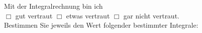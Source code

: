 \documentclass[12pt]{exam}
\begin{document}
\begin{questions}
\begin{parts}
\end{parts}
\pagebreak
{}

Mit der Integralrechnung bin ich\\ $\Box$ gut vertraut \hfill $\Box$ etwas vertraut \hfill $\Box$ gar nicht vertraut. \\[2ex]
Bestimmen Sie jeweils den Wert folgender bestimmter Integrale:\\

\begin{parts}

\part \[\int_a^b x {\rm ~d}x = 
~~~~~~~~~~~~~~~~~~~~~~~~~~~~~~~~~~~~~~~~~~~~~~~~~~~~~~~~~~~~~~~~~~~~~~~~~~~~\]
~~\\~~\\~~\\

\part \[\int_0^x {\rm e}^{at} {\rm ~d}t = 
~~~~~~~~~~~~~~~~~~~~~~~~~~~~~~~~~~~~~~~~~~~~~~~~~~~~~~~~~~~~~~~~~~~~~~~~~~~~\]
~~\\~~\\~~\\

\part \[\int_0^\pi \sin u {\rm ~d}u = 
~~~~~~~~~~~~~~~~~~~~~~~~~~~~~~~~~~~~~~~~~~~~~~~~~~~~~~~~~~~~~~~~~~~~~~~~~~~~\]
~~\\~~\\~~\\

\part \[\int_1^{\Lambda} \frac{w-1}{w^2-1} {\rm ~d}w = 
~~~~~~~~~~~~~~~~~~~~~~~~~~~~~~~~~~~~~~~~~~~~~~~~~~~~~~~~~~~~~~~~~~~~~~~~~~~~\]

\end{parts}
\end{questions}
\end{document}
